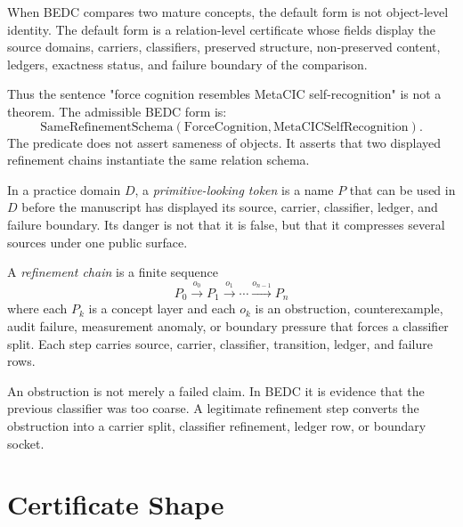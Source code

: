 \begin{principle}
\label{prin:layered-relation-before-identity}
When BEDC compares two mature concepts, the default form is not object-level identity. The default form is a relation-level certificate whose fields display the source domains, carriers, classifiers, preserved structure, non-preserved content, ledgers, exactness status, and failure boundary of the comparison.
\end{principle}

Thus the sentence "force cognition resembles MetaCIC self-recognition" is not a theorem. The admissible BEDC form is:
$$
\mathrm{SameRefinementSchema}(\mathrm{ForceCognition},\mathrm{MetaCICSelfRecognition}).
$$
The predicate does not assert sameness of objects. It asserts that two displayed refinement chains instantiate the same relation schema.

\begin{definition}
\label{def:layered-relation-primitive-token}
In a practice domain $D$, a \emph{primitive-looking token} is a name $P$ that can be used in $D$ before the manuscript has displayed its source, carrier, classifier, ledger, and failure boundary. Its danger is not that it is false, but that it compresses several sources under one public surface.
\end{definition}

\begin{definition}
\label{def:layered-relation-refinement-chain}
A \emph{refinement chain} is a finite sequence
$$
P_0 \xrightarrow{o_0} P_1 \xrightarrow{o_1} \cdots \xrightarrow{o_{n-1}} P_n
$$
where each $P_k$ is a concept layer and each $o_k$ is an obstruction, counterexample, audit failure, measurement anomaly, or boundary pressure that forces a classifier split. Each step carries source, carrier, classifier, transition, ledger, and failure rows.
\end{definition}

\begin{principle}
\label{prin:layered-relation-obstruction-classifier-pressure}
An obstruction is not merely a failed claim. In BEDC it is evidence that the previous classifier was too coarse. A legitimate refinement step converts the obstruction into a carrier split, classifier refinement, ledger row, or boundary socket.
\end{principle}

\section{Certificate Shape}
\label{sec:layered-relation-certificate-shape}

